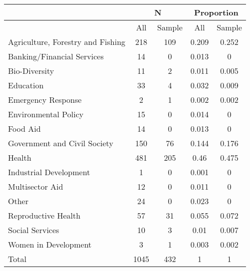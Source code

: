  \begin{tabular}{l cc cc}  & \multicolumn{2}{c}{N} & \multicolumn{2}{c}{Proportion} \\  \hline  & All & Sample & All & Sample \\ \hline Agriculture, Forestry and Fishing  &  218  &  109  &  0.209  &  0.252  \\ 
 Banking/Financial Services  &  14  &  0  &  0.013  &  0  \\ 
 Bio-Diversity  &  11  &  2  &  0.011  &  0.005  \\ 
 Education  &  33  &  4  &  0.032  &  0.009  \\ 
 Emergency Response  &  2  &  1  &  0.002  &  0.002  \\ 
 Environmental Policy  &  15  &  0  &  0.014  &  0  \\ 
 Food Aid  &  14  &  0  &  0.013  &  0  \\ 
 Government and Civil Society  &  150  &  76  &  0.144  &  0.176  \\ 
 Health  &  481  &  205  &  0.46  &  0.475  \\ 
 Industrial Development  &  1  &  0  &  0.001  &  0  \\ 
 Multisector Aid  &  12  &  0  &  0.011  &  0  \\ 
 Other  &  24  &  0  &  0.023  &  0  \\ 
 Reproductive Health  &  57  &  31  &  0.055  &  0.072  \\ 
 Social Services  &  10  &  3  &  0.01  &  0.007  \\ 
 Women in Development  &  3  &  1  &  0.003  &  0.002  \\ 
  \hline Total &  1045  &  432  &  1 & 1 \\ \hline  \end{tabular} 